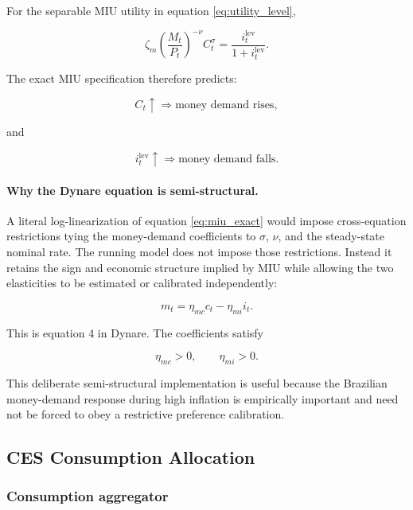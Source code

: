 For the separable MIU utility in equation \eqref{eq:utility_level},

\begin{equation}
\zeta_m
\left(\frac{M_t}{P_t}\right)^{-\nu}
C_t^\sigma
=
\frac{i_t^{\mathrm{lev}}}{1+i_t^{\mathrm{lev}}}.
\label{eq:miu_exact}
\end{equation}

The exact MIU specification therefore predicts:

\[
C_t\uparrow
\Rightarrow
\text{money demand rises},
\]

and

\[
i_t^{\mathrm{lev}}\uparrow
\Rightarrow
\text{money demand falls}.
\]

\paragraph{Why the Dynare equation is semi-structural.}

A literal log-linearization of equation \eqref{eq:miu_exact} would impose
cross-equation restrictions tying the money-demand coefficients to
\(\sigma\), \(\nu\), and the steady-state nominal rate. The running model does
not impose those restrictions. Instead it retains the sign and economic
structure implied by MIU while allowing the two elasticities to be estimated
or calibrated independently:

\begin{equation}
\boxed{
m_t
=
\eta_{mc}c_t
-
\eta_{mi}i_t.
}
\label{eq:money_final}
\end{equation}

This is equation 4 in Dynare. The coefficients satisfy

\[
\eta_{mc}>0,
\qquad
\eta_{mi}>0.
\]

This deliberate semi-structural implementation is useful because the Brazilian
money-demand response during high inflation is empirically important and need
not be forced to obey a restrictive preference calibration.

\subsection{CES Consumption Allocation}
\label{app:ces}

\subsubsection{Consumption aggregator}

